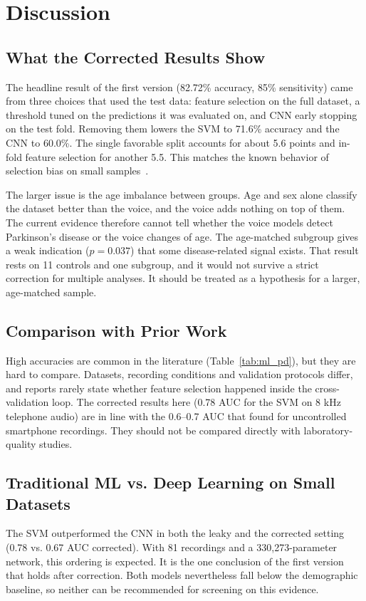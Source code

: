 \documentclass{paper}
\begin{document}
\section{Discussion}

\subsection{What the Corrected Results Show}
The headline result of the first version (82.72\% accuracy, 85\% sensitivity) came from three choices that used the test data: feature selection on the full dataset, a threshold tuned on the predictions it was evaluated on, and CNN early stopping on the test fold. Removing them lowers the SVM to 71.6\% accuracy and the CNN to 60.0\%. The single favorable split accounts for about 5.6 points and in-fold feature selection for another 5.5. This matches the known behavior of selection bias on small samples~\cite{ambroise2002selection, varma2006bias}.

The larger issue is the age imbalance between groups. Age and sex alone classify the dataset better than the voice, and the voice adds nothing on top of them. The current evidence therefore cannot tell whether the voice models detect Parkinson's disease or the voice changes of age. The age-matched subgroup gives a weak indication ($p = 0.037$) that some disease-related signal exists. That result rests on 11 controls and one subgroup, and it would not survive a strict correction for multiple analyses. It should be treated as a hypothesis for a larger, age-matched sample.

\subsection{Comparison with Prior Work}
High accuracies are common in the literature (Table~\ref{tab:ml_pd}), but they are hard to compare. Datasets, recording conditions and validation protocols differ, and reports rarely state whether feature selection happened inside the cross-validation loop. The corrected results here (0.78 AUC for the SVM on 8 kHz telephone audio) are in line with the 0.6--0.7 AUC that \citet{carron2021mobile} found for uncontrolled smartphone recordings. They should not be compared directly with laboratory-quality studies.

\subsection{Traditional ML vs. Deep Learning on Small Datasets}
The SVM outperformed the CNN in both the leaky and the corrected setting (0.78 vs. 0.67 AUC corrected). With 81 recordings and a 330,273-parameter network, this ordering is expected. It is the one conclusion of the first version that holds after correction. Both models nevertheless fall below the demographic baseline, so neither can be recommended for screening on this evidence.
\end{document}
